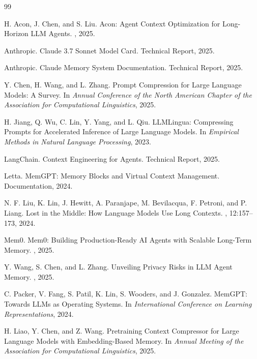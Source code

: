 \begin{thebibliography}{99}

H. Acon, J. Chen, and S. Liu.
\newblock Acon: Agent Context Optimization for Long-Horizon LLM Agents.
, 2025.

Anthropic.
\newblock Claude 3.7 Sonnet Model Card.
\newblock Technical Report, 2025.

Anthropic.
\newblock Claude Memory System Documentation.
\newblock Technical Report, 2025.

Y. Chen, H. Wang, and L. Zhang.
\newblock Prompt Compression for Large Language Models: A Survey.
\newblock In {\em Annual Conference of the North American Chapter of the Association for Computational Linguistics}, 2025.

H. Jiang, Q. Wu, C. Lin, Y. Yang, and L. Qiu.
\newblock LLMLingua: Compressing Prompts for Accelerated Inference of Large Language Models.
\newblock In {\em Empirical Methods in Natural Language Processing}, 2023.

LangChain.
\newblock Context Engineering for Agents.
\newblock Technical Report, 2025.

Letta.
\newblock MemGPT: Memory Blocks and Virtual Context Management.
\newblock Documentation, 2024.

N. F. Liu, K. Lin, J. Hewitt, A. Paranjape, M. Bevilacqua, F. Petroni, and P. Liang.
\newblock Lost in the Middle: How Language Models Use Long Contexts.
, 12:157--173, 2024.

Mem0.
\newblock Mem0: Building Production-Ready AI Agents with Scalable Long-Term Memory.
, 2025.

Y. Wang, S. Chen, and L. Zhang.
\newblock Unveiling Privacy Risks in LLM Agent Memory.
, 2025.

C. Packer, V. Fang, S. Patil, K. Lin, S. Wooders, and J. Gonzalez.
\newblock MemGPT: Towards LLMs as Operating Systems.
\newblock In {\em International Conference on Learning Representations}, 2024.

H. Liao, Y. Chen, and Z. Wang.
\newblock Pretraining Context Compressor for Large Language Models with Embedding-Based Memory.
\newblock In {\em Annual Meeting of the Association for Computational Linguistics}, 2025.


\end{thebibliography}
